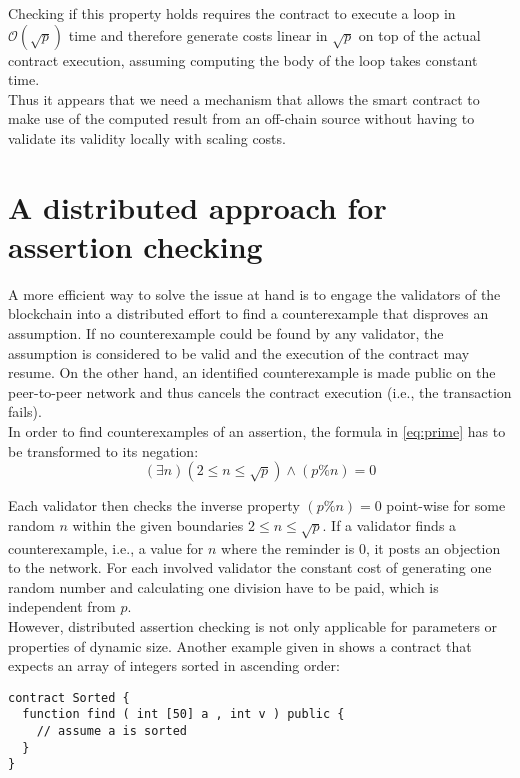 Checking if this property holds requires the contract to execute a loop in $\mathcal{O}(\sqrt{p})$ time and therefore generate costs linear in $\sqrt{p}$ on top of the actual contract execution, assuming computing the body of the loop takes constant time.\\
Thus it appears that we need a mechanism that allows the smart contract to make use of the computed result from an off-chain source without having to validate its validity locally with scaling costs.

\section{A distributed approach for assertion checking}
A more efficient way to solve the issue at hand is to engage the validators of the blockchain into a distributed effort to find a counterexample that disproves an assumption. If no counterexample could be found by any validator, the assumption is considered to be valid and the execution of the contract may resume. On the other hand, an identified counterexample is made public on the peer-to-peer network and thus cancels the contract execution (i.e., the transaction fails). \\
In order to find counterexamples of an assertion, the formula in \ref{eq:prime} has to be transformed to its negation:
\begin{equation}\label{eq:prime_neg}
	(\exists n) (2 \le n \le \sqrt{p}) \wedge (p \% n) = 0
\end{equation}

Each validator then checks the inverse property $(p \% n) = 0$ point-wise for some random $n$ within the given boundaries $2 \le n \le \sqrt{p}$. If a validator finds a counterexample, i.e., a value for $n$ where the reminder is $0$, it posts an objection to the network. For each involved validator the constant cost of generating one random number and calculating one division have to be paid, which is independent from $p$. \\
However, distributed assertion checking is not only applicable for parameters or properties of dynamic size. Another example given in \cite{thiemann_2020} shows a contract that expects an array of integers sorted in ascending order: 

\begin{lstlisting}[caption=Smart Contract expecting a sorted array, numbers=none, language=Solidity]
contract Sorted {
  function find ( int [50] a , int v ) public {
    // assume a is sorted
  }
}
\end{lstlisting}
 
